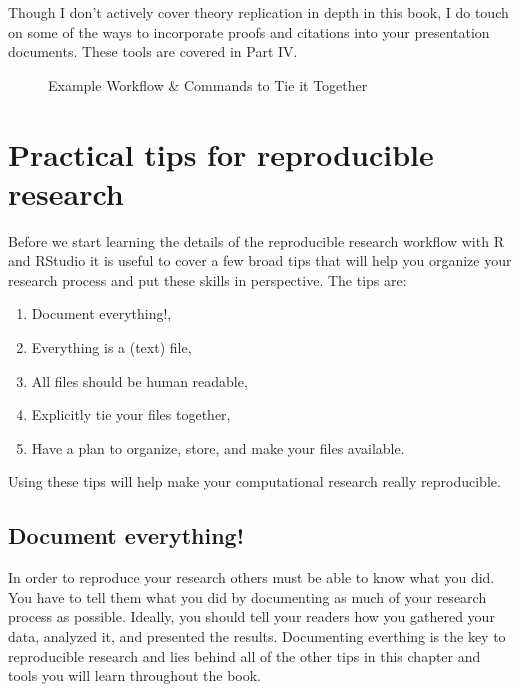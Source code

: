 \documentclass[krantz1]{krantz}
\begin{document}
Though I don't actively cover theory replication in depth in this book, I do touch on some of the ways to incorporate proofs and citations into your presentation documents. These tools are covered in Part IV.

\begin{landscape}
        \begin{figure}
            \caption{Example Workflow \& Commands to Tie it Together}
            \label{WorkflowTies}
                
        \end{figure}
\end{landscape}

\section{Practical tips for reproducible research}

Before we start learning the details of the reproducible research workflow with R and RStudio it is useful to cover a few broad tips that will help you organize your research process and put these skills in perspective. The tips are:

\begin{enumerate}
    \item Document everything!,
    \item Everything is a (text) file,
    \item All files should be human readable,
    \item Explicitly tie your files together,
    \item Have a plan to organize, store, and make your files available.    
\end{enumerate}

\noindent Using these tips will help make your computational research really reproducible.

\subsection{Document everything!}

In order to reproduce your research others must be able to know what you did. You have to tell them what you did by documenting as much of your research process as possible. Ideally, you should tell your readers how you gathered your data, analyzed it, and presented the results. Documenting everthing is the key to reproducible research and lies behind all of the other tips in this chapter and tools you will learn throughout the book.
\end{document}

